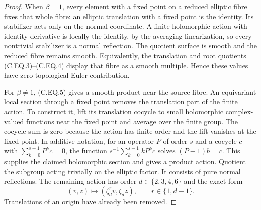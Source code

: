 \begin{proof}
When $\beta=1$, every element with a fixed point
on a reduced elliptic fibre fixes that whole fibre:
an elliptic translation with a fixed point is the
identity. Its stabilizer acts only on the normal
coordinate. A finite holomorphic action with
identity derivative is locally the identity,
by the averaging linearization, so every nontrivial
stabilizer is a normal reflection. The quotient
surface is smooth and the reduced fibre remains
smooth. Equivalently, the translation and root
quotients (C.EQ.3)--(C.EQ.4) display that fibre
as a smooth multiple. Hence these values have
zero topological Euler contribution.

For $\beta\ne1$, (C.EQ.5) gives a smooth product
near the source fibre. An equivariant local section
through a fixed point removes the translation part
of the finite action. To construct it, lift its
translation cocycle to small holomorphic complex-valued
functions near the fixed point and average over the
finite group. The cocycle sum is zero because the
action has finite order and the lift vanishes at
the fixed point. In additive notation, for an operator
$P$ of order $s$ and a cocycle $c$ with
$\sum_{k=0}^{s-1}P^kc=0$, the function
$s^{-1}\sum_{k=0}^{s-1}kP^kc$ solves
$(P-1)b=c$. This supplies the claimed holomorphic
section and gives a product action.
Quotient the subgroup acting trivially on the
elliptic factor. It consists of pure normal
reflections. The remaining action has order
$d\in\{2,3,4,6\}$ and the exact form
\[
             (v,z)\longmapsto(\zeta_d^r v,\zeta_d z),
             \qquad r\in\{1,d-1\}.                   \tag{C.EQ.6}
\]
Translations of an origin have already been removed.


\end{proof}

